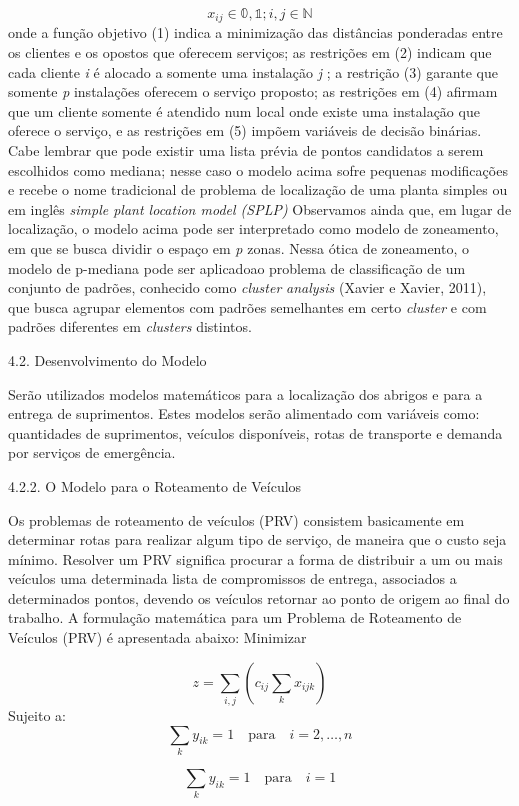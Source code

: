 \documentclass[
]{article}
\begin{document}
\[
x_{ij} \in \mathbb{0,1}; i,j \in \mathbb{N}\] onde a função objetivo (1)
indica a minimização das distâncias ponderadas entre os clientes e os
opostos que oferecem serviços; as restrições em (2) indicam que cada
cliente \emph{i} é alocado a somente uma instalação \emph{j} ; a
restrição (3) garante que somente \emph{p} instalações oferecem o
serviço proposto; as restrições em (4) afirmam que um cliente somente é
atendido num local onde existe uma instalação que oferece o serviço, e
as restrições em (5) impõem variáveis de decisão binárias. Cabe lembrar
que pode existir uma lista prévia de pontos candidatos a serem
escolhidos como mediana; nesse caso o modelo acima sofre pequenas
modificações e recebe o nome tradicional de problema de localização de
uma planta simples ou em inglês \emph{simple plant location model
(SPLP)} Observamos ainda que, em lugar de localização, o modelo acima
pode ser interpretado como modelo de zoneamento, em que se busca dividir
o espaço em \emph{p} zonas. Nessa ótica de zoneamento, o modelo de
p-mediana pode ser aplicadoao problema de classificação de um conjunto
de padrões, conhecido como \emph{cluster} \emph{analysis} (Xavier e
Xavier, 2011), que busca agrupar elementos com padrões semelhantes em
certo \emph{cluster} e com padrões diferentes em \emph{clusters}
distintos.

4.2. Desenvolvimento do Modelo

Serão utilizados modelos matemáticos para a localização dos abrigos e
para a entrega de suprimentos. Estes modelos serão alimentado com
variáveis como: quantidades de suprimentos, veículos disponíveis, rotas
de transporte e demanda por serviços de emergência.

4.2.2. O Modelo para o Roteamento de Veículos

Os problemas de roteamento de veículos (PRV) consistem basicamente em
determinar rotas para realizar algum tipo de serviço, de maneira que o
custo seja mínimo. Resolver um PRV significa procurar a forma de
distribuir a um ou mais veículos uma determinada lista de compromissos
de entrega, associados a determinados pontos, devendo os veículos
retornar ao ponto de origem ao final do trabalho. A formulação
matemática para um Problema de Roteamento de Veículos (PRV) é
apresentada abaixo: Minimizar

\[z=\sum_{i,j}(c_{ij}\sum_{k}x_{ijk})\] Sujeito a:
\[\sum_{k}y_{ik}=1 \quad \text{para} \quad  i=2, \dots,n\]

\[\sum_{k}y_{ik}=1\quad \text{para} \quad  i=1\]
\end{document}
